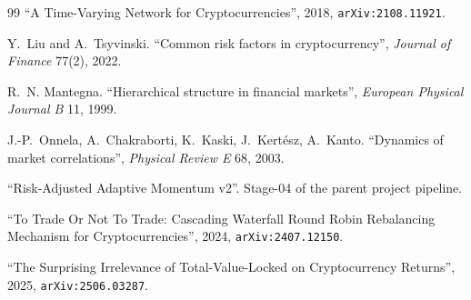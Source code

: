 \documentclass[11pt,a4paper]{article}
\begin{document}
\begin{thebibliography}{99}
``A Time-Varying Network for Cryptocurrencies'', 2018, \texttt{arXiv:2108.11921}.

Y.~Liu and A.~Tsyvinski. ``Common risk factors in cryptocurrency'', \emph{Journal of Finance} 77(2), 2022.

R.~N. Mantegna. ``Hierarchical structure in financial markets'', \emph{European Physical Journal B} 11, 1999.

J.-P.~Onnela, A.~Chakraborti, K.~Kaski, J.~Kert{\'e}sz, A.~Kanto. ``Dynamics of market correlations'', \emph{Physical Review E} 68, 2003.

``Risk-Adjusted Adaptive Momentum v2''. Stage-04 of the parent project pipeline.

``To Trade Or Not To Trade: Cascading Waterfall Round Robin Rebalancing Mechanism for Cryptocurrencies'', 2024, \texttt{arXiv:2407.12150}.

``The Surprising Irrelevance of Total-Value-Locked on Cryptocurrency Returns'', 2025, \texttt{arXiv:2506.03287}.

\end{thebibliography}
\end{document}
